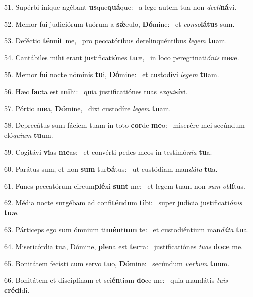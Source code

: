 51. Supérbi iníque agébant \textbf{us}que\textbf{quá}que: \ast\  a lege autem tua non \textit{de}\textit{cli}\textbf{ná}vi.\

52. Memor fui judiciórum tuórum a \textbf{sǽ}culo, \textbf{Dó}mine: \ast\  et \textit{con}\textit{so}\textbf{lá}\textbf{tus} sum.\

53. Deféctio \textbf{té}nu\textbf{it} me, \ast\  pro peccatóribus derelinquéntibus \textit{le}\textit{gem} \textbf{tu}am.\

54. Cantábiles mihi erant justificati\textbf{ó}nes \textbf{tu}æ, \ast\  in loco peregrinati\textit{ó}\textit{nis} \textbf{me}æ.\

55. Memor fui nocte nóminis \textbf{tu}i, \textbf{Dó}mine: \ast\  et custodívi \textit{le}\textit{gem} \textbf{tu}am.\

56. Hæc \textbf{fac}ta est \textbf{mi}hi: \ast\  quia justificatiónes tuas \textit{ex}\textit{qui}\textbf{sí}vi.\

57. Pórtio \textbf{me}a, \textbf{Dó}mine, \ast\  dixi custodíre \textit{le}\textit{gem} \textbf{tu}am.\

58. Deprecátus sum fáciem tuam in toto \textbf{cor}de \textbf{me}o: \ast\  miserére mei secúndum eló\textit{qui}\textit{um} \textbf{tu}um.\

59. Cogitávi \textbf{vi}as \textbf{me}as: \ast\  et convérti pedes meos in testimó\textit{ni}\textit{a} \textbf{tu}a.\

60. Parátus sum, et non \textbf{sum} tur\textbf{bá}tus: \ast\  ut custódiam man\textit{dá}\textit{ta} \textbf{tu}a.\

61. Funes peccatórum circum\textbf{plé}xi \textbf{sunt} me: \ast\  et legem tuam non \textit{sum} \textit{ob}\textbf{lí}tus.\

62. Média nocte surgébam ad confi\textbf{tén}dum \textbf{ti}bi: \ast\  super judícia justificati\textit{ó}\textit{nis} \textbf{tu}æ.\

63. Párticeps ego sum ómnium ti\textbf{mén}ti\textbf{um} te: \ast\  et custodiéntium man\textit{dá}\textit{ta} \textbf{tu}a.\

64. Misericórdia tua, Dómine, \textbf{ple}na est \textbf{ter}ra: \ast\  justificatiónes \textit{tu}\textit{as} \textbf{do}\textbf{ce} me.\

65. Bonitátem fecísti cum servo \textbf{tu}o, \textbf{Dó}mine: \ast\  secúndum \textit{ver}\textit{bum} \textbf{tu}um.\

66. Bonitátem et disciplínam et sci\textbf{én}tiam \textbf{do}ce me: \ast\  quia mandátis \textit{tu}\textit{is} \textbf{cré}\textbf{di}di.\

